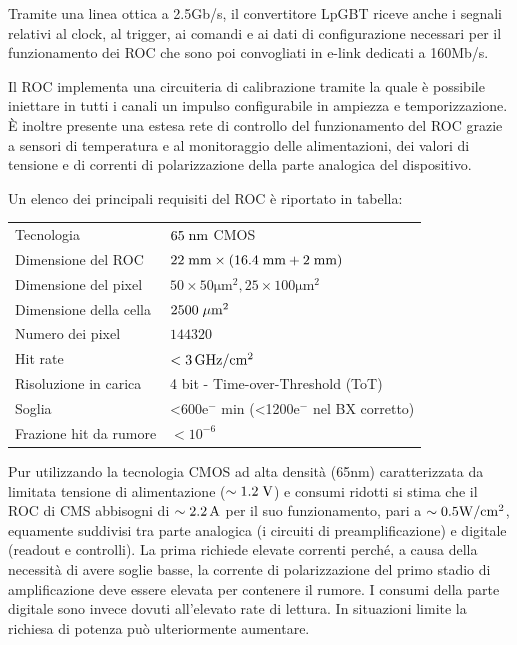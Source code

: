 Tramite una linea ottica a 2.5Gb/s, il convertitore LpGBT riceve anche i segnali relativi al clock, al trigger, ai comandi e ai dati di configurazione necessari per il funzionamento dei ROC che sono poi convogliati in e-link dedicati a 160Mb/s. 

Il ROC implementa una circuiteria di calibrazione tramite la quale \`e possibile iniettare in tutti i canali un impulso configurabile in ampiezza e temporizzazione. \`E inoltre presente una estesa rete di controllo del funzionamento del ROC grazie a sensori di temperatura e al monitoraggio delle alimentazioni, dei valori di tensione e di correnti di polarizzazione della parte analogica del dispositivo.

%
%

Un elenco dei principali requisiti del ROC \`e riportato in tabella:

\begin{tabular}{ll}
\toprule
\midrule
Tecnologia & $65\rm \; nm$ CMOS\\
Dimensione del ROC & $\mathrm{22\rm \; mm \times (16.4\rm \; mm + 2\rm \; mm)}$ \\
Dimensione del pixel & $\mathrm{50 \times 50 \mu m^2, 25 \times 100 \mu m^2}$ \\
Dimensione della cella & $\mathrm{2500\; \mu \rm m^2}$ \\
Numero dei pixel & $\mathrm{144320}$ \\
Hit rate & $\mathrm{< 3 {\rm \, GHz}/cm^2}$ \\
Risoluzione in carica & 4 bit - Time-over-Threshold (ToT) \\
Soglia & <600e$^-$ min (<1200e$^-$ nel BX corretto)\\
Frazione hit da rumore &  $\mathrm{<10^{-6}}$\\
\bottomrule
\end{tabular}



Pur utilizzando la tecnologia CMOS ad alta densit\`a (65nm) caratterizzata da limitata tensione di alimentazione ($\sim 1.2\rm \; V$) e consumi ridotti si stima che il ROC di CMS abbisogni di $\sim 2.2\rm \, A$ per il suo funzionamento, pari a $\sim 0.5{\mathrm W}/\mathrm{cm}^2$, equamente suddivisi tra parte analogica (i circuiti di preamplificazione) e digitale (readout e controlli). La prima richiede elevate correnti perch\'e, a causa della necessit\`a di avere soglie basse, la corrente di polarizzazione del primo stadio di amplificazione deve essere elevata per contenere il rumore. I consumi della parte digitale sono invece dovuti all'elevato rate di lettura. In situazioni limite la richiesa di potenza pu\`o ulteriormente aumentare.

